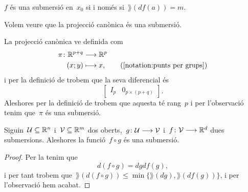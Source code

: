 \documentclass[../../main.tex]{subfiles}
\begin{document}
    \begin{observation}
        \label{obs:submersió si i només si té rang més petit o igual}
        \(f\) és una submersió en~\(x_{0}\) si i només si~\(\rang(df(a))=m\).
    \end{observation}
    \begin{example}
        \label{ex:la projecció canònica és una submersió}
        Volem veure que la projecció canònica és una submersió.
    \end{example}
    \begin{solution}
        La projecció canònica ve definida com
        \begin{align*}
            \pi\colon\mathbb{R}^{p+q}&\longrightarrow\mathbb{R}^{p} \\
            (x;y)&\longmapsto x, \tag{\ref{notation:punts per grups}}
        \end{align*}
        i per la definició de  trobem que la seva diferencial és
        \[\left[\begin{array}{c|c}
        I_{p} & 0_{p\times(p+q)}
        \end{array}\right].\]
        Aleshores per la definició de  trobem que aquesta té rang~\(p\) i per l'observació  tenim que~\(\pi\) és una submersió.
    \end{solution}
    \begin{proposition}
        \label{prop:la composició de submersions és submersió}
        Siguin~\(\mathcal{U}\subseteq\mathbb{R}^{n}\) i~\(\mathcal{V}\subseteq\mathbb{R}^{m}\) dos oberts,~\(g\colon\mathcal{U}\longrightarrow\mathcal{V}\) i~\(f\colon\mathcal{V}\longrightarrow\mathbb{R}^{d}\) dues submersions.
        Aleshores la funció~\(f\circ g\) és una submersió.
    \end{proposition}
    \begin{proof}
        Per la  tenim que
        \[
            d(f\circ g)=dgdf(g),
        \]
        i per tant trobem que~\(\rang(d(f\circ g))\leq\min\{\rang(dg),\rang(df(g))\}\), i per l'observació  hem acabat.
    \end{proof}
\end{document}
